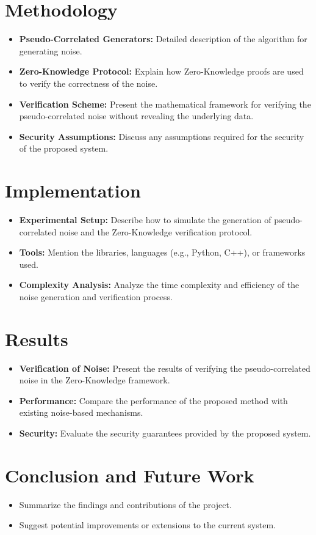 \documentclass[11pt]{article}
\begin{document}
\section{Methodology}
\begin{itemize}
	\item \textbf{Pseudo-Correlated Generators:} Detailed description of the algorithm for generating noise.
	\item \textbf{Zero-Knowledge Protocol:} Explain how Zero-Knowledge proofs are used to verify the correctness of the noise.
	\item \textbf{Verification Scheme:} Present the mathematical framework for verifying the pseudo-correlated noise without revealing the underlying data.
	\item \textbf{Security Assumptions:} Discuss any assumptions required for the security of the proposed system.
\end{itemize}

\section{Implementation}
\begin{itemize}
	\item \textbf{Experimental Setup:} Describe how to simulate the generation of pseudo-correlated noise and the Zero-Knowledge verification protocol.
	\item \textbf{Tools:} Mention the libraries, languages (e.g., Python, C++), or frameworks used.
	\item \textbf{Complexity Analysis:} Analyze the time complexity and efficiency of the noise generation and verification process.
\end{itemize}

\section{Results}
\begin{itemize}
	\item \textbf{Verification of Noise:} Present the results of verifying the pseudo-correlated noise in the Zero-Knowledge framework.
	\item \textbf{Performance:} Compare the performance of the proposed method with existing noise-based mechanisms.
	\item \textbf{Security:} Evaluate the security guarantees provided by the proposed system.
\end{itemize}

\section{Conclusion and Future Work}
\begin{itemize}
	\item Summarize the findings and contributions of the project.
	\item Suggest potential improvements or extensions to the current system.
\end{itemize}



\end{document}
